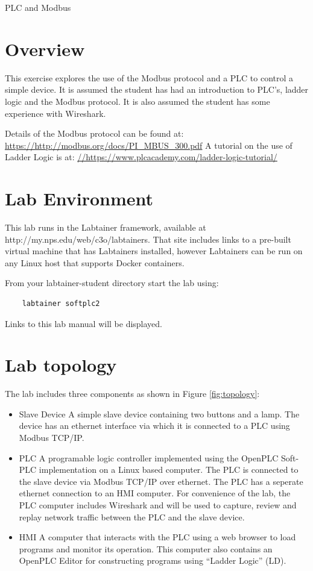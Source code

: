 


\begin{center}
{\LARGE PLC and Modbus}
\vspace{0.1in}\\
\end{center}


\section{Overview}
This exercise explores the use of the Modbus protocol and a
PLC to control a simple device.
It is assumed the student has had an introduction to PLC's, ladder logic and 
the Modbus protocol.  It is also assumed the student has some experience with
Wireshark.

Details of the Modbus protocol can be found at:
\url {https://http://modbus.org/docs/PI\_MBUS\_300.pdf}
A tutorial on the use of Ladder Logic is at:
\url {//https://www.plcacademy.com/ladder-logic-tutorial/}


\section{Lab Environment}
This lab runs in the Labtainer framework,
available at http://my.nps.edu/web/c3o/labtainers.
That site includes links to a pre-built virtual machine
that has Labtainers installed, however Labtainers can
be run on any Linux host that supports Docker containers.

From your labtainer-student directory start the lab using:
\begin{verbatim}
    labtainer softplc2
\end{verbatim}
Links to this lab manual will be displayed.  

\section{Lab topology}
The lab includes three components as shown in Figure \ref{fig:topology}:
\begin{itemize}
\item{Slave Device} A simple slave device containing two buttons and a lamp.  The device has an
ethernet interface via which it is connected to a PLC using Modbus TCP/IP.
\item{PLC} A programable logic controller implemented using the OpenPLC Soft-PLC implementation
on a Linux based computer.  The PLC is connected to the slave device via Modbus TCP/IP over ethernet.
The PLC has a seperate ethernet connection to an HMI computer.
For convenience of the lab, the PLC computer includes Wireshark and will be used to capture, review and
replay network traffic between the PLC and the slave device.  

\item{HMI} A computer that interacts with the PLC using a web browser to load programs and monitor its operation.  This
computer also contains an OpenPLC Editor for constructing programs using ``Ladder Logic'' (LD).
\end{itemize}

